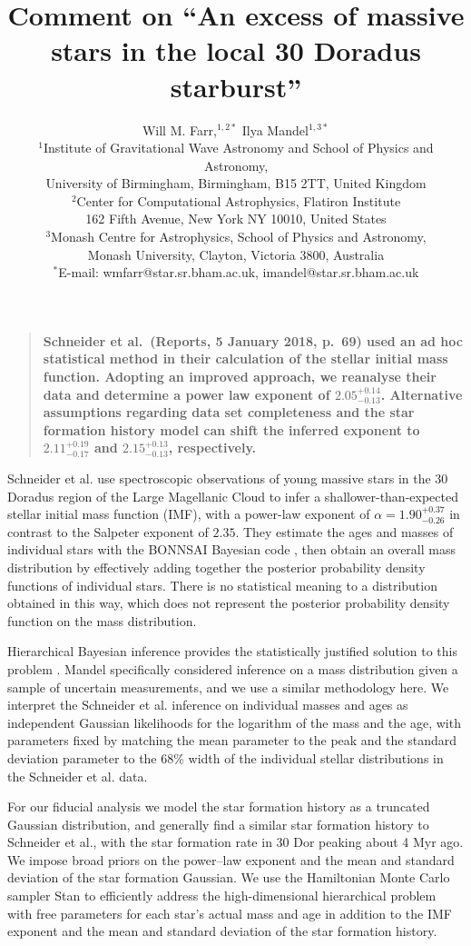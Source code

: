 \documentclass[12pt]{article}
\title{Comment on ``An excess of massive stars in the local 30 Doradus starburst''}
\author{Will M. Farr,$^{1,2\ast}$ Ilya Mandel$^{1,3\ast}$\\
\normalsize{$^1$Institute of Gravitational Wave Astronomy and School of Physics and Astronomy,}\\
\normalsize{University of Birmingham, Birmingham, B15 2TT, United Kingdom}\\
\normalsize{$^2$Center for Computational Astrophysics, Flatiron Institute}\\
\normalsize{162 Fifth Avenue, New York NY 10010, United States} \\
\normalsize{$^3$Monash Centre for Astrophysics, School of Physics and Astronomy,}\\
\normalsize{Monash University, Clayton, Victoria 3800, Australia}\\
\normalsize{$^\ast$E-mail: wmfarr@star.sr.bham.ac.uk, imandel@star.sr.bham.ac.uk}
}
\date{}
\newenvironment{sciabstract}{%
\begin{quote} \bf}
{\end{quote}}
\newcommand{\onesigrange}[3]{\ensuremath{#1^{+#2}_{-#3}}}
\newcommand{\alpharangeone}{\onesigrange{2.05}{0.14}{0.13}}
\newcommand{\alpharangethree}{\onesigrange{2.11}{0.19}{0.17}}
\newcommand{\alpharangefour}{\onesigrange{2.15}{0.13}{0.13}}
\begin{document}

\baselineskip24pt


\maketitle



\begin{sciabstract}
Schneider et al.~(Reports, 5 January 2018, p.~69) used an ad hoc statistical method in their calculation of the stellar initial mass function. Adopting an improved approach, we reanalyse their data and determine a power law exponent of $\alpharangeone$. Alternative assumptions regarding data set completeness and the star formation history model can shift the inferred exponent to $\alpharangethree$ and $\alpharangefour$, respectively.
\end{sciabstract}

Schneider et al.\cite{Schneider:2018} use spectroscopic observations of young massive stars in
the 30 Doradus region of the Large Magellanic Cloud to infer a
shallower-than-expected stellar initial mass function (IMF), with a power-law exponent of $\alpha=1.90^{+0.37}_{-0.26}$ in contrast to the Salpeter exponent of $2.35$\cite{Salpeter:1955}.  They estimate the ages and masses of individual
stars with the BONNSAI Bayesian code \cite{Schneider:2017}, then obtain
an overall mass distribution by effectively adding together the posterior
probability density functions of individual stars.  There is no statistical
meaning to a distribution obtained in this way, which does not represent the
posterior probability density function on the mass distribution.

Hierarchical Bayesian inference provides the statistically justified solution to
this problem \cite{Hogg:2010}.  Mandel\cite{Mandel:2010stat} specifically considered
inference on a mass distribution given a sample of uncertain measurements, and
we use a similar methodology here.  We interpret the Schneider et al.\cite{Schneider:2018}
inference on individual masses and ages as independent Gaussian likelihoods for
the logarithm of the mass and the age, with parameters fixed by matching the mean
parameter to the peak and the standard deviation parameter to the 68\% width of
the individual stellar distributions in the Schneider et al.\cite{Schneider:2018} data.

For our fiducial analysis we model the star formation history as a truncated Gaussian distribution, and
generally find a similar star formation history to Schneider et al.\cite{Schneider:2018}, with
the star formation rate in 30 Dor peaking about 4 Myr ago.  We impose broad priors
on the power--law exponent and the mean and standard deviation of the star
formation Gaussian.    We use the Hamiltonian Monte Carlo sampler Stan
\cite{STAN} to efficiently address the high-dimensional hierarchical problem
with free parameters for each star's actual mass and age in addition to
the IMF exponent and the mean and standard deviation of the star formation
history.
\end{document}
